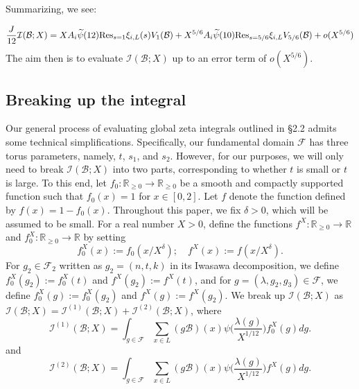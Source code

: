 \documentclass{article}
\def\Res{{\rm Res}}
\def\R{{\mathbb R}}
\def\cB{{\mathcal B}}
\def\FF{{\mathcal F}}
\def\I{{\mathcal I}}
\def\wt{\widetilde}
\begin{document}
Summarizing, we see:

\begin{equation}\label{eq:Iexpansion}
    \frac{J}{12}\I(\cB;X)=XA_i\wt{\psi}(12)\Res_{s=1}\xi_{i,L}(s)V_1(\cB)+ X^{5/6}A_i\wt{\psi}(10)\Res_{s=5/6}\xi_{i,L}V_{5/6}(\cB) + o(X^{5/6})
\end{equation}
The aim then is to evaluate $\I(\cB;X)$ up to an error term of $o(X^{5/6})$. 


\subsection{Breaking up the integral}

Our general process of evaluating global zeta integrals outlined in \S2.2 admits some technical simplifications. Specifically, our fundamental domain $\FF$ has three torus parameters, namely, $t$, $s_1$, and $s_2$. However, for our purposes, we will only need to break $\I(\cB;X)$ into two parts, corresponding to whether $t$ is small or $t$ is large. To this end, let $f_0:\R_{\geq 0}\to \R_{\geq 0}$ be a smooth and compactly supported function such that $f_0(x)=1$ for $x\in[0,2]$. Let $f$ denote the function defined by $f(x)=1-f_0(x)$. Throughout this paper, we fix $\delta>0$, which will be assumed to be small. For a real number $X>0$, define the functions $f^X:\R_{\geq 0}\to\R$ and $f_0^X:\R_{\geq 0}\to \R$ by setting
\begin{equation*}
f_0^X(x):=f_0(x/X^\delta);\quad f^X(x):=f(x/X^\delta).
\end{equation*}
For $g_2\in\FF_2$ written as $g_2=(n,t,k)$ in its Iwasawa decomposition, we define $f_0^X(g_2):=f_0^X(t)$ and $f^X(g_2):=f^X(t)$, and for $g=(\lambda,g_2,g_3)\in\FF$, we define $f_0^X(g):=f_0^X(g_2)$ and $f^X(g):=f^X(g_2)$.
We break up $\I(\cB;X)$ as $\I(\cB;X)=\I^{(1)}(\cB;X)+\I^{(2)}(\cB;X)$, where
\begin{equation}\label{eq:I1-def}
    \I^{(1)}(\cB;X)=\int_{g\in\FF}\sum_{x\in L} (g\cB)(x)\psi\Big(\frac{\lambda(g)}{X^{1/12}}\Big)f_0^X(g)dg.
\end{equation}
and
\begin{equation}\label{eq:I1-def}
    \I^{(2)}(\cB;X)=\int_{g\in\FF}\sum_{x\in L} (g\cB)(x)\psi\Big(\frac{\lambda(g)}{X^{1/12}}\Big)f^X(g)dg.
\end{equation}
\end{document}

